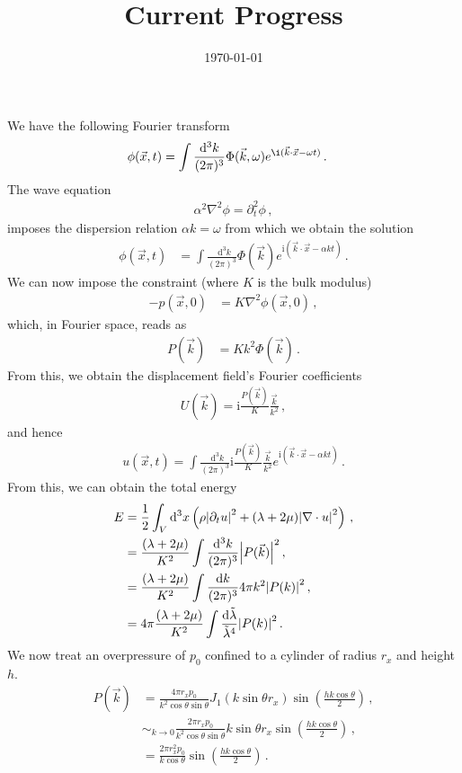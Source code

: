 \documentclass{article}
\title{Current Progress}
\date{\today}
\newcommand*\diff{\mathop{}\!\mathrm{d}}
\newcommand*\te[1]{\text{#1}}
\newcommand*\p[1]{\left(#1\right)}
\newcommand*\f[2]{\frac{#1}{#2}}
\newcommand*\I{\te{i}}
\begin{document}
\maketitle

We have the following Fourier transform
\begin{align}
\phi(\vec x,t)&=\int\f{\diff^3 k}{(2\pi)^3}\Phi(\vec k,\omega)e^{\i(\vec k\cdot\vec x-\omega t)}\,.
\end{align}
The wave equation
\begin{align}
\alpha^2\nabla^2\phi=\partial_t^2\phi\,,
\end{align}
imposes the dispersion relation $\alpha k=\omega$ from which we obtain the solution
\begin{align}
\phi(\vec x,t)&=\int\f{\diff^3 k}{(2\pi)^3}\Phi(\vec k)e^{\I(\vec k\cdot\vec x-\alpha k t)}\,.
\end{align}
We can now impose the constraint (where $K$ is the bulk modulus)
\begin{align}
-p(\vec x,0)&=K\nabla^2\phi(\vec x,0)\,,
\end{align}
which, in Fourier space, reads as
\begin{align}
P(\vec k)&=K k^2\Phi(\vec k)\,.
\end{align}
From this, we obtain the displacement field's Fourier coefficients
\begin{align}
U(\vec k)=\I\f{P(\vec k)}{K}\f{\vec k}{k^2}\,,
\end{align}
and hence
\begin{align}
u(\vec x,t)=\int\f{\diff^3 k}{(2\pi)^3}\I\f{P(\vec k)}{K}\f{\vec k}{k^2}e^{\I(\vec k\cdot\vec x-\alpha k t)}\,.
\end{align}
From this, we can obtain the total energy
\begin{align}
E&=\f12\int_V\diff^3 x\p{\rho\abs{\partial_t u}^2+(\lambda+2\mu)\abs{\nabla\cdot u}^2}\,,\\
&=\f{(\lambda+2\mu)}{K^2}\int\f{\diff^3 k}{(2\pi)^3}\abs{P(\vec k)}^2\,,\\
&=\f{(\lambda+2\mu)}{K^2}\int\f{\diff k}{(2\pi)^3}4\pi k^2\abs{P(k)}^2\,,\\
&=4\pi\f{(\lambda+2\mu)}{K^2}\int\f{\diff \tilde\lambda}{\tilde\lambda^4}\abs{P(k)}^2\,.
\end{align}
We now treat an overpressure of $p_0$ confined to a cylinder of radius $r_x$ and height $h$.
\begin{align}
P(\vec k)&=\f{4\pi r_x p_0}{k^2\cos\theta\sin\theta} J_1(k\sin\theta r_x)\sin\p{\f{h k\cos\theta}{2}}\,,\\
&\sim_{k\to0}\f{2\pi r_x p_0}{k^2\cos\theta\sin\theta} k\sin\theta r_x \sin\p{\f{h k\cos\theta}{2}}\,,\\
&=\f{2\pi r_x^2 p_0}{k\cos\theta}  \sin\p{\f{h k\cos\theta}{2}}\,.
\end{align}
\end{document}
